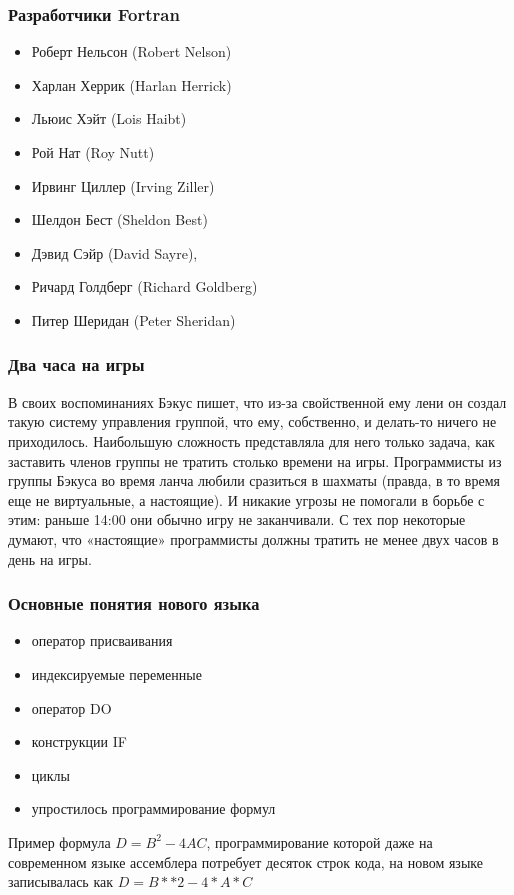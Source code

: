 \documentclass{beamer}
\begin{document}
\begin{frame}
\frametitle{Разработчики Fortran}
\begin{itemize}
	\item Роберт Нельсон (Robert Nelson) 
	\item Харлан Херрик (Harlan Herrick)
	\item Льюис Хэйт (Lois Haibt)
	\item Рой Нат (Roy Nutt)
	\item Ирвинг Циллер (Irving Ziller)
	\item Шелдон Бест (Sheldon Best)
	\item Дэвид Сэйр (David Sayre), 
	\item Ричард Голдберг (Richard Goldberg)
	\item Питер Шеридан (Peter Sheridan)
\end{itemize}

\end{frame}

\begin{frame}
\frametitle{Два часа на игры}
В своих воспоминаниях Бэкус пишет, что из-за свойственной ему лени он создал такую систему управления группой, что ему, собственно, и делать-то ничего не приходилось. Наибольшую сложность представляла для него только задача, как заставить членов группы не тратить столько времени на игры. Программисты из группы Бэкуса во время ланча любили сразиться в шахматы (правда, в то время еще не виртуальные, а настоящие). И никакие угрозы не помогали в борьбе с этим: раньше 14:00 они обычно игру не заканчивали. С тех пор некоторые думают, что «настоящие» программисты должны тратить не менее двух часов в день на игры.

\end{frame}

\begin{frame}
\frametitle{Основные понятия нового языка}
\begin{itemize}
	\item оператор присваивания
	\item индексируемые переменные
	\item оператор DO
	\item конструкции IF
	\item циклы
	\item упростилось программирование формул
\end{itemize}

\begin{exampleblock}{Пример}
формула $D=B^2-4AC$, программирование которой даже на современном языке ассемблера потребует десяток строк кода, на новом языке записывалась как $D=B**2-4*A*C$
\end{exampleblock}
\end{frame}
\end{document}
